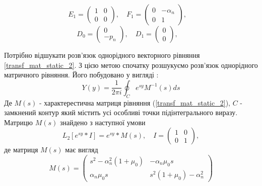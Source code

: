 \begin{equation*}
    E_1 = \begin{pmatrix}
        1 & 0 \\
        0 & 0
    \end{pmatrix}, \quad
    F_1 = \begin{pmatrix}
        0 & -\alpha_n \\
        0 & 1
    \end{pmatrix}, \quad
\end{equation*}
\begin{equation*}
    D_0 = \begin{pmatrix}
        0 \\
        -p_n
    \end{pmatrix}, \quad
    D_1 = \begin{pmatrix}
        0 \\
        0
    \end{pmatrix}, \quad
\end{equation*}

Потрібно відшукати розв'язок однорідного векторного рівняння \eqref{transf_mat_static_2}.
З цією метою спочатку розшукуємо розв'язок однорідного матричного рівняння.
Його побудовано у вигляді \cite{gantmaher}:
\begin{equation}
    Y(y) = \frac{1}{2\pi i} \oint_C e^{sy} M^{-1}(s)ds
\end{equation}
Де $M(s)$ - характерестична матриця рівняння (\ref{transf_mat_static_2}), $C$ - замкнений контур який містить усі особливі точки підінтегрального виразу.
Матрицю $M(s)$ знайдено з наступної умови
\begin{equation}
    L_2\left[ e^{sy}*I \right] = e^{sy} * M(s), \quad I = \begin{pmatrix} 1 & 0 \\ 0 & 1 \end{pmatrix},
\end{equation}
де матриця $M(s)$ має вигляд
\begin{equation}
    M(s) = \begin{pmatrix}
        s^2 -\alpha_n^2(1 + \mu_0) & -\alpha_n \mu_0 s \\
        \alpha_n \mu_0 s & s^2 (1 + \mu_0) -\alpha_n^2
     \end{pmatrix}
\end{equation}

